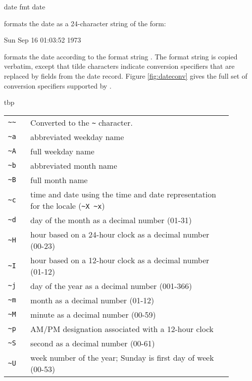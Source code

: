  {date} \str
{}  {fmt date} \str
\begin{desc}
     formats the date as a 24-character string of the
    form:
    \begin{tightinset}
    Sun Sep 16 01:03:52 1973            
    \end{tightinset}
    
     formats the date according to the format string
    . The format string is copied verbatim, except that tilde
    characters indicate conversion specifiers that are replaced by fields from
    the date record.  Figure \ref{fig:dateconv} gives the full set of
    conversion specifiers supported by .

\begin{boxedfigure}{tbp}
    \renewcommand{\arraystretch}{1.25}
    \begin{tabular}{l>{\raggedrightparbox}p{0.9\linewidth}}
      \verb|~~| &   Converted to the \verb|~| character. \\
      \verb|~a| &   abbreviated weekday name \\
      \verb|~A| &   full weekday name \\
      \verb|~b| &   abbreviated month name \\
      \verb|~B| &   full month name \\
      \verb|~c| &   time and date using the time and date representation 
                    for the locale (\verb|~X ~x|) \\
      \verb|~d| &   day of the month as a decimal number (01-31) \\
      \verb|~H| &   hour based on a 24-hour clock
                    as a decimal number (00-23) \\
      \verb|~I| &   hour based on a 12-hour clock
                    as a decimal number (01-12) \\
      \verb|~j| &   day of the year as a decimal number (001-366) \\
      \verb|~m| &   month as a decimal number (01-12) \\
      \verb|~M| &   minute as a decimal number (00-59) \\
      \verb|~p| &   AM/PM designation associated with a 12-hour clock \\
      \verb|~S| &   second as a decimal number (00-61) \\
      \verb|~U| &   week number of the year; 
                    Sunday is first day of week (00-53) \\

\end{tabular}
\end{boxedfigure}
\end{desc}
